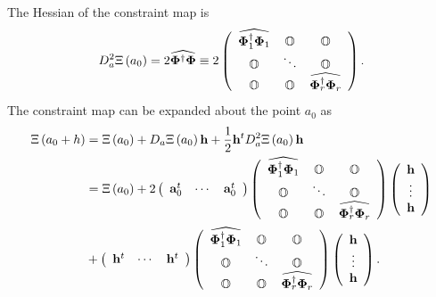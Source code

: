 \documentclass[aps,preprint]{revtex4}%
\begin{document}
The Hessian of the constraint map is
\begin{equation}
D_{a}^{2}\Xi\left(  a_{0}\right)  =2\widehat{\mathbf{\Phi}^{\dagger
}\mathbf{\Phi}}\equiv2\left(
\begin{array}
[c]{ccc}%
\widehat{\mathbf{\Phi}_{1}^{\dagger}\mathbf{\Phi}_{1}} & \mathbb{O} &
\mathbb{O}\\
\mathbb{O} & \ddots & \mathbb{O}\\
\mathbb{O} & \mathbb{O} & \widehat{\mathbf{\Phi}_{r}^{\dagger}\mathbf{\Phi
}_{r}}%
\end{array}
\right)  .
\end{equation}
The constraint map can be expanded about the point $a_{0}$ as
\begin{align}
\Xi\left(  a_{0}+h\right)   &  =\Xi\left(  a_{0}\right)  +D_{a}\Xi\left(
a_{0}\right)  \mathbf{h}+\frac{1}{2}\mathbf{h}^{t}D_{a}^{2}\Xi\left(
a_{0}\right)  \mathbf{h}\nonumber\\
&  =\Xi\left(  a_{0}\right)  +2\left(
\begin{array}
[c]{ccc}%
\mathbf{a}_{0}^{t} & \cdots & \mathbf{a}_{0}^{t}%
\end{array}
\right)  \left(
\begin{array}
[c]{ccc}%
\widehat{\mathbf{\Phi}_{1}^{\dagger}\mathbf{\Phi}_{1}} & \mathbb{O} &
\mathbb{O}\\
\mathbb{O} & \ddots & \mathbb{O}\\
\mathbb{O} & \mathbb{O} & \widehat{\mathbf{\Phi}_{r}^{\dagger}\mathbf{\Phi
}_{r}}%
\end{array}
\right)  \left(
\begin{array}
[c]{c}%
\mathbf{h}\\
\vdots\\
\mathbf{h}%
\end{array}
\right) \nonumber\\
&  +\left(
\begin{array}
[c]{ccc}%
\mathbf{h}^{t} & \cdots & \mathbf{h}^{t}%
\end{array}
\right)  \left(
\begin{array}
[c]{ccc}%
\widehat{\mathbf{\Phi}_{1}^{\dagger}\mathbf{\Phi}_{1}} & \mathbb{O} &
\mathbb{O}\\
\mathbb{O} & \ddots & \mathbb{O}\\
\mathbb{O} & \mathbb{O} & \widehat{\mathbf{\Phi}_{r}^{\dagger}\mathbf{\Phi
}_{r}}%
\end{array}
\right)  \left(
\begin{array}
[c]{c}%
\mathbf{h}\\
\vdots\\
\mathbf{h}%
\end{array}
\right)  \mathbf{.}%
\end{align}
\end{document}
